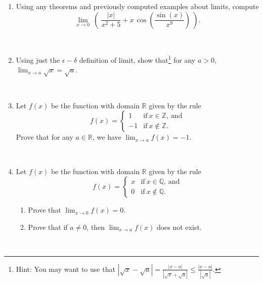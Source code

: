 \documentclass{amsart}
\def\e{\varepsilon}
\def\R{\mathbb R}
\def\N{\mathbb N}
\def\Q{\mathbb Q}
\def\Z{\mathbb Z}
\def\e{\epsilon}
\begin{document}
\begin{enumerate}

\item Using any theorems and previously computed examples about limits, compute
\[ \lim_{x\to 0} \  \left(\  \frac{ |x| }{x^2+5} + x \, \cos\left( \frac{ \sin(x)}{x^9} \right)\ \right).\]

\

\item Using just the $\e-\delta$ definition of limit, show that\footnote{Hint: You may want to use that $\displaystyle |\sqrt{x} - \sqrt{a} | = \frac{ |x-a| }{|\sqrt{x} + \sqrt{a} | }\leq\frac{ |x-a| }{|\sqrt{a} |}.$} for any $a>0$, $\lim_{x\to a} \sqrt{x} = \sqrt{a}$.

\

	\item Let $f(x)$ be the function with domain $\R$ given by the rule
	\[ f(x) = \begin{cases} 1 &\textrm{if} \ x\in \Z, \, \textrm{and} \\ 
		-1 &\text{if} \ x\notin \Z.\end{cases}\]
		Prove that for any $a\in \R$, we have $\lim_{x \to a} f(x)=-1$.
		
		\
		
		
		
			\item Let $f(x)$ be the function with domain $\R$ given by the rule
	\[ f(x) = \begin{cases} x &\text{if} \ x\in \Q, \, \textrm{and} \\ 
		0 &\text{if} \ x\notin \Q.\end{cases}\]
		\begin{enumerate}
		\item Prove that $\lim_{x \to 0} f(x)=0$.
		\item Prove that if $a\neq 0$, then $\lim_{x\to a} f(x)$ does not exist.
	\end{enumerate}			
\end{enumerate}

\
\end{document}
